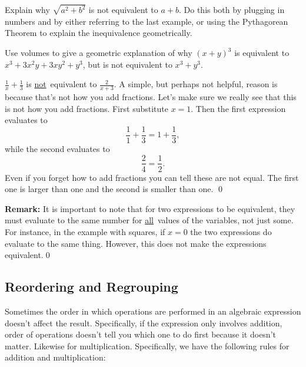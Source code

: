 \begin{question} Explain why $\sqrt{a^2 + b^2}$ is not equivalent to $a+b$. Do this both by plugging in numbers and by either referring to the last example, or using the Pythagorean Theorem to explain the inequivalence geometrically.
\end{question}

\par

\begin{question} Use volumes to give a geometric explanation of why $(x+y)^3$ is equivalent to $x^3+3x^2y+3xy^2+y^3$, but is not equivalent to $x^3+y^3$.
\end{question}

\par 

\begin{eg} $\frac{1}{x}+\frac{1}{3}$ is \underline{not}\normalfont\ equivalent to $\frac{2}{x+3}$. A simple, but perhaps not helpful, reason is because that's not how you add fractions. Let's make sure we really see that this is not how you add fractions. First substitute $x=1$. Then the first expression evaluates to
\[
\frac{1}{1} + \frac{1}{3}=1+\frac{1}{3},
\]  
while the second evaluates to
\[
\frac{2}{4} = \frac{1}{2}.
\]
Even if you forget how to add fractions you can tell these are not equal. The first one is larger than one and the second is smaller than one.
\qed
\end{eg}
\par 

{\bf Remark:} It is important to note that for two expressions to be equivalent, they must evaluate to the same number for \underline{all}\normalfont\ values of the variables, not just some. For instance, in the example with squares, if $x=0$ the two expressions do evaluate to the same thing. However, this does not make the expressions equivalent.\qed  

\subsection{Reordering and Regrouping}

Sometimes the order in which operations are performed in an algebraic expression doesn't affect the result. Specifically, if the expression only involves addition, order of operations doesn't tell you which one to do first because it doesn't matter. Likewise for multiplication. Specifically, we have the following rules for addition and multiplication:

